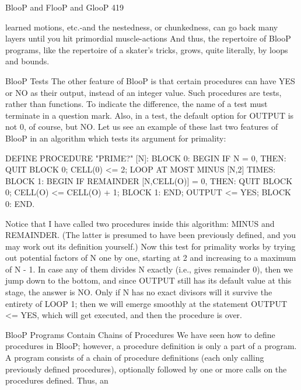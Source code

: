 BlooP and FlooP and GlooP                                                                419

learned motions, etc.-and the nestedness, or chunkedness, can go back many layers until
you hit primordial muscle-actions And thus, the repertoire of BlooP programs, like the
repertoire of a skater's tricks, grows, quite literally, by loops and bounds.

                                      BlooP Tests
The other feature of BlooP is that certain procedures can have YES or NO as their
output, instead of an integer value. Such procedures are tests, rather than functions. To
indicate the difference, the name of a test must terminate in a question mark. Also, in a
test, the default option for OUTPUT is not 0, of course, but NO.
Let us see an example of these last two features of BlooP in an algorithm which tests its
argument for primality:

       DEFINE PROCEDURE "PRIME?" [N]:
       BLOCK 0: BEGIN
                  IF N = 0, THEN:
                  QUIT BLOCK 0;
                  CELL(0) <= 2;
                  LOOP AT MOST MINUS [N,2] TIMES:
                  BLOCK 1: BEGIN
                               IF REMAINDER [N,CELL(O)] = 0, THEN:
                               QUIT BLOCK 0;
                               CELL(O) <= CELL(O) + 1;
                  BLOCK 1: END;
                  OUTPUT <= YES;
       BLOCK 0: END.

Notice that I have called two procedures inside this algorithm: MINUS and
REMAINDER. (The latter is presumed to have been previously defined, and you may
work out its definition yourself.) Now this test for primality works by trying out potential
factors of N one by one, starting at 2 and increasing to a maximum of N - 1. In case any
of them divides N exactly (i.e., gives remainder 0), then we jump down to the bottom,
and since OUTPUT still has its default value at this stage, the answer is NO. Only if N
has no exact divisors will it survive the entirety of LOOP 1; then we will emerge
smoothly at the statement OUTPUT <= YES, which will get executed, and then the
procedure is over.

               BlooP Programs Contain Chains of Procedures
We have seen how to define procedures in BlooP; however, a procedure definition is only
a part of a program. A program consists of a chain of procedure definitions (each only
calling previously defined procedures), optionally followed by one or more calls on the
procedures defined. Thus, an




